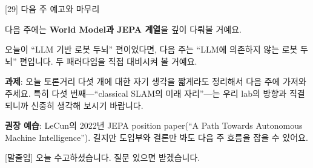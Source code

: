 \documentclass[aspectratio=169,10pt]{beamer}
\newenvironment{script}{%
  \footnotesize
  \setlength{\parskip}{0.5em}
  \setlength{\parindent}{0pt}
}{}
\begin{document}
\begin{frame}{[29] 다음 주 예고와 마무리}
\begin{script}
다음 주에는 \textbf{World Model과 JEPA 계열}을 깊이 다뤄볼 거예요.

오늘이 ``LLM 기반 로봇 두뇌'' 편이었다면, 다음 주는 ``LLM에 의존하지 않는 로봇 두뇌'' 편입니다. 두 패러다임을 직접 대비시켜 볼 거예요.

\textbf{과제}: 오늘 토론거리 다섯 개에 대한 자기 생각을 짧게라도 정리해서 다음 주에 가져와 주세요. 특히 다섯 번째---``classical SLAM의 미래 자리''---는 우리 lab의 방향과 직결되니까 신중히 생각해 보시기 바랍니다.

\textbf{권장 예습}: LeCun의 2022년 JEPA position paper(``A Path Towards Autonomous Machine Intelligence''). 길지만 도입부와 결론만 봐도 다음 주 흐름을 잡을 수 있어요.

[말줄임] 오늘 수고하셨습니다. 질문 있으면 받겠습니다.
\end{script}
\end{frame}
\end{document}
